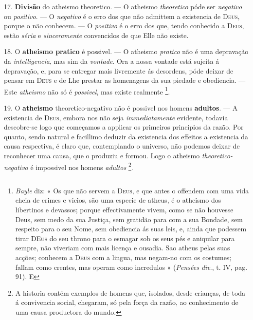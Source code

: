17. \textbf{Divisão} do atheismo theoretico. --- O atheismo \emph{theoretico} póde ser \emph{negativo} ou \emph{positivo}. --- O \emph{negativo} é o erro dos que não admittem a existencia de \textsc{Deus}, porque o não conhecem. --- O \emph{positivo} é o erro dos que, tendo conhecido a \textsc{Deus}, estão \emph{séria} e \emph{sinceramente} convencidos de que Elle não existe.

 18. O \textbf{atheismo pratico} é possivel. --- O atheismo \emph{pratico} não é uma depravação da \emph{intelligencia}, mas sim da \emph{vontade}. Ora a nossa vontade está sujeita á depravação, e, para se entregar mais livremente ás desordens, póde deixar de pensar em \textsc{Deus} e de Lhe prestar as homenagens da sua piedade e obediencia. --- Este \emph{atheismo} não só é \emph{possivel}, mas existe realmente \footnote{\emph{Bayle} diz: « Os que não servem a \textsc{Deus}, e que antes o offendem com uma vida cheia de crimes e vicios, são uma especie de atheus, é o atheismo dos libertinos e devassos; porque effectivamente vivem, como se não houvesse Deus, sem medo da sua Justiça, sem gratidão para com a sua Bondade, sem respeito para o seu Nome, sem obediencia ás suas leis, e, ainda que podessem tirar \textsc{DEus} do seu throno para o esmagar sob os seus pés e aniquilar para sempre, não viveriam com mais licença e ousadia. Sao atheus pelas suas acções; conhecem a \textsc{Deus} com a lingua, mas negam-no com os costumes; fallam como crentes, mas operam como incredulos » (\emph{Pensées div}., t. IV, pag. 91). E}.

19. O \textbf{atheismo} theoretico-negativo não é possivel nos homens \textbf{adultos}. --- A existencia de \textsc{Deus}, embora nos não seja \emph{immediatamente} evidente, todavia descobre-se logo que começamos a applicar os primeiros principios da razão. Por quanto, sendo natural e facillimo deduzir da existencia dos effeitos a existencia da causa respectiva, é claro que, contemplando o universo, não podemos deixar de reconhecer uma causa, que o   produziu e formou. Logo o atheismo \emph{theoretico-negativo} é impossivel nos homens \emph{adultos} \footnote{A historia contém exemplos de homens que, isolados, desde crianças, de toda á convivencia social, chegaram, só pela força da razão, ao conhecimento de uma causa productora do mundo.}.

